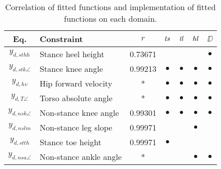 \begin{table*}[t!]
  \centering
  \caption{Correlation of fitted functions and implementation of fitted functions on each domain.}
  \begin{tabular}{| c | l | c || c | c | c | c |}
    \hline
        {\bf Eq.} & {\bf Constraint} & $r$ & $\mathit{ts}$ & $\mathit{tl}$ & $\mathit{hl}$ & $\DD$ \\
        \hline
        $y_{d,sthh}$ & Stance heel height & 0.73671 & & & & $\bullet$ \\
        \hline
        $y_{d,stk\angle}$ & Stance knee angle & 0.99213 & $\bullet$ & $\bullet$ & $\bullet$ & $\bullet$ \\
        \hline
        $y_{d,hv}$ & Hip forward velocity  & * & $\bullet$ & $\bullet$ & $\bullet$ & $\bullet$ \\
        \hline
        $y_{d,T\angle}$ & Torso absolute angle & * & $\bullet$ & $\bullet$ & $\bullet$ & $\bullet$ \\
        \hline
        $y_{d,nsk\angle}$ & Non-stance knee angle & 0.99301 & $\bullet$ & $\bullet$ & $\bullet$ & $\bullet$ \\
        \hline
        $y_{d,nslm}$ & Non-stance leg slope & 0.99971 & & & $\bullet$ & \\
        \hline
        $y_{d,stth}$ & Stance toe height & 0.99971 & $\bullet$ & & &\\
        \hline
        $y_{d,nsa\angle}$ & Non-stance ankle angle & * & & & $\bullet$ & $\bullet$\\
        \hline
  \end{tabular}
  \label{tab:fitcor}
\end{table*}
